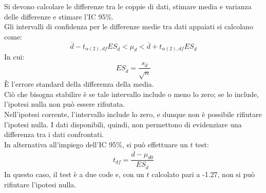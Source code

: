 \documentclass[10pt, draft]{book}
\newcounter{example}[section]
\begin{document}
\begin{example}
\begin{figure}[H]
        \caption{\small{}}
    \end{figure}
    Si devono calcolare le differenze tra le coppie di dati, stimare media e varianza delle differenze e stimare l'IC 95\%.
    \\
    Gli intervalli di confidenza per le differenze medie tra dati appaiati si calcolano come:
    \begin{equation}
        \overline{d}-t_{\alpha(2),df}ES_{\overline{d}}<\mu_d<\overline{d}+t_{\alpha(2),df}ES_{\overline{d}}
    \end{equation}
    In cui:
    \begin{equation}
        ES_{\overline{d}} = \frac{s_{\overline{d}}}{\sqrt{n}}
    \end{equation}
    È l'errore standard della differenza della media.
    \\
    Ciò che bisogna stabilire è se tale intervallo include o meno lo zero; se lo include, l'ipotesi nulla non può essere rifiutata.
    \\
    Nell'ipotesi corrente, l'intervallo include lo zero, e dunque non è possibile rifiutare l'ipotesi nulla. I dati disponibili, quindi, non permettono di evidenziare una differenza tra i dati confrontati.
    \\
    In alternativa all'impiego dell'IC 95\%, si può effettuare un $t$ test:
    \begin{equation}
        t_{df} = \frac{\overline{d}-\mu_{d0}}{ES_{\overline{d}}}
    \end{equation}
    In questo caso, il test è a due code e, con un $t$ calcolato pari a -1.27, non si può rifiutare l'ipotesi nulla.
\end{example}
\clearpage
\end{document}
